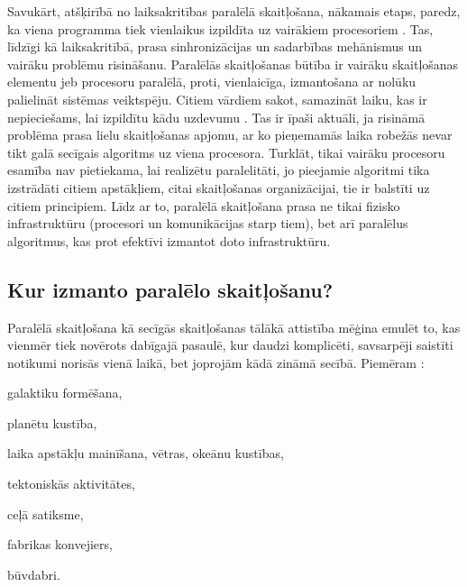 Savukārt, atšķirībā no laiksakritības paralēlā skaitļošana, nākamais etaps, paredz, ka
viena programma tiek vienlaikus izpildīta uz vairākiem procesoriem \cite{IntParComp, ConcVsParall,
PatParProg, ParProgMPI}. Tas, līdzīgi kā laiksakritībā, prasa sinhronizācijas un sadarbības
mehānismus un vairāku problēmu risināšanu. Paralēlās skaitļošanas būtība ir vairāku skaitļošanas
elementu jeb procesoru paralēlā, proti, vienlaicīga, izmantošana ar nolūku palielināt sistēmas
veiktspēju. Citiem vārdiem sakot, samazināt laiku, kas ir nepieciešams, lai izpildītu kādu
uzdevumu .
Tas ir īpaši aktuāli,
ja risināmā problēma prasa lielu skaitļošanas apjomu, ar ko pieņemamās laika robežās nevar
tikt galā secīgais algoritms uz viena procesora. Turklāt, tikai vairāku procesoru esamība
nav pietiekama, lai realizētu paralelitāti, jo pieejamie algoritmi tika izstrādāti citiem
apstākļiem, citai skaitļošanas organizācijai, tie ir balstīti uz citiem principiem. Līdz ar
to, paralēlā skaitļošana prasa ne tikai fizisko infrastruktūru (procesori un komunikācijas
starp tiem), bet arī paralēlus algoritmus, kas prot efektīvi izmantot doto infrastruktūru.


\subsection{Kur izmanto paralēlo skaitļošanu?}
Paralēlā skaitļošana kā secīgās skaitļošanas tālākā attistība mēģina emulēt to, kas vienmēr
tiek novērots dabīgajā pasaulē, kur daudzi komplicēti, savsarpēji saistīti notikumi norisās
vienā laikā, bet joprojām kādā zināmā secībā. Piemēram \cite{IntParComp}:
\begin{dotlist}
	\item galaktiku formēšana,
	\item planētu kustība,
	\item laika apstākļu mainīšana, vētras, okeānu kustības,
	\item tektoniskās aktivitātes,
	\item ceļā satiksme,
	\item fabrikas konvejiers,
	\item būvdabri.
\end{dotlist}


